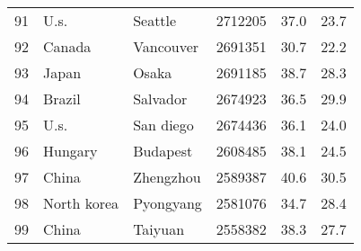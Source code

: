 \begin{center}
\begin{longtable}{clllcc}
        91                                       & U.s.                                 & Seattle                           & 2712205                                 & 37.0                                  & 23.7                                  \\
        92                                       & Canada                               & Vancouver                         & 2691351                                 & 30.7                                  & 22.2                                  \\
        93                                       & Japan                                & Osaka                             & 2691185                                 & 38.7                                  & 28.3                                  \\
        94                                       & Brazil                               & Salvador                          & 2674923                                 & 36.5                                  & 29.9                                  \\
        95                                       & U.s.                                 & San diego                         & 2674436                                 & 36.1                                  & 24.0                                  \\
        96                                       & Hungary                              & Budapest                          & 2608485                                 & 38.1                                  & 24.5                                  \\
        97                                       & China                                & Zhengzhou                         & 2589387                                 & 40.6                                  & 30.5                                  \\
        98                                       & North korea                          & Pyongyang                         & 2581076                                 & 34.7                                  & 28.4                                  \\
        99                                       & China                                & Taiyuan                           & 2558382                                 & 38.3                                  & 27.7                                  \\

\end{longtable}
\end{center}
